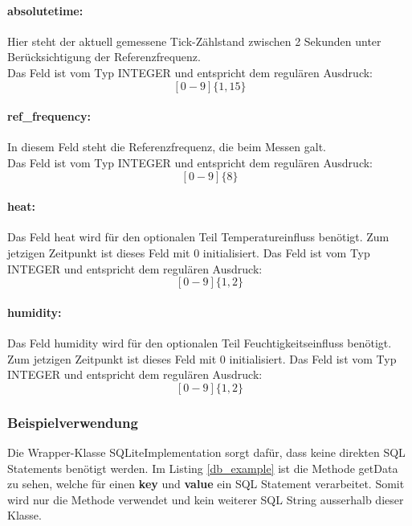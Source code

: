     \paragraph{absolutetime:}
    Hier steht der aktuell gemessene Tick-Zählstand zwischen 2 Sekunden unter Berücksichtigung der Referenzfrequenz.\\
    Das Feld ist vom Typ INTEGER und entspricht dem regulären Ausdruck:
    $$[0-9]\{1,15\}$$
    \paragraph{ref\_frequency:}
    In diesem Feld steht die Referenzfrequenz, die beim Messen galt.\\
    Das Feld ist vom Typ INTEGER und entspricht dem regulären Ausdruck:
    $$[0-9]\{8\}$$
    \paragraph{heat:}
    Das Feld heat wird für den optionalen Teil Temperatureinfluss benötigt. Zum jetzigen Zeitpunkt ist dieses Feld mit 0 initialisiert.
    Das Feld ist vom Typ INTEGER und entspricht dem regulären Ausdruck:
    $$[0-9]\{1,2\}$$
    \paragraph{humidity:}
    Das Feld humidity wird für den optionalen Teil Feuchtigkeitseinfluss benötigt. Zum jetzigen Zeitpunkt ist dieses Feld mit 0 initialisiert.
    Das Feld ist vom Typ INTEGER und entspricht dem regulären Ausdruck:
    $$[0-9]\{1,2\}$$
    
    \subsubsection{Beispielverwendung}
    Die Wrapper-Klasse SQLiteImplementation sorgt dafür, dass keine direkten SQL Statements benötigt werden. Im Listing \ref{db_example} ist die Methode getData zu sehen, welche für einen \textbf{key} und \textbf{value} ein SQL Statement verarbeitet. Somit wird nur die Methode verwendet und kein weiterer SQL String ausserhalb dieser Klasse.
    
    